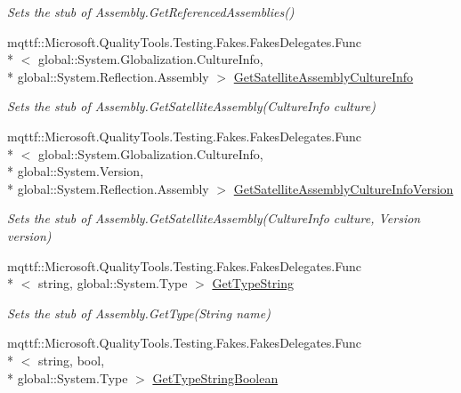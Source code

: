 \begin{DoxyCompactItemize}
\begin{DoxyCompactList}\small\item\em Sets the stub of Assembly.\-Get\-Referenced\-Assemblies()\end{DoxyCompactList}\item 
mqttf\-::\-Microsoft.\-Quality\-Tools.\-Testing.\-Fakes.\-Fakes\-Delegates.\-Func\\*
$<$ global\-::\-System.\-Globalization.\-Culture\-Info, \\*
global\-::\-System.\-Reflection.\-Assembly $>$ \hyperlink{class_system_1_1_reflection_1_1_fakes_1_1_stub_assembly_ab74404daaacf9351673b34b7cb87ffa0}{Get\-Satellite\-Assembly\-Culture\-Info}
\begin{DoxyCompactList}\small\item\em Sets the stub of Assembly.\-Get\-Satellite\-Assembly(\-Culture\-Info culture)\end{DoxyCompactList}\item 
mqttf\-::\-Microsoft.\-Quality\-Tools.\-Testing.\-Fakes.\-Fakes\-Delegates.\-Func\\*
$<$ global\-::\-System.\-Globalization.\-Culture\-Info, \\*
global\-::\-System.\-Version, \\*
global\-::\-System.\-Reflection.\-Assembly $>$ \hyperlink{class_system_1_1_reflection_1_1_fakes_1_1_stub_assembly_acd122bd330cb44eb78f75cf6732974c3}{Get\-Satellite\-Assembly\-Culture\-Info\-Version}
\begin{DoxyCompactList}\small\item\em Sets the stub of Assembly.\-Get\-Satellite\-Assembly(\-Culture\-Info culture, Version version)\end{DoxyCompactList}\item 
mqttf\-::\-Microsoft.\-Quality\-Tools.\-Testing.\-Fakes.\-Fakes\-Delegates.\-Func\\*
$<$ string, global\-::\-System.\-Type $>$ \hyperlink{class_system_1_1_reflection_1_1_fakes_1_1_stub_assembly_a288c281e4297182d10278fa34405f5ba}{Get\-Type\-String}
\begin{DoxyCompactList}\small\item\em Sets the stub of Assembly.\-Get\-Type(\-String name)\end{DoxyCompactList}\item 
mqttf\-::\-Microsoft.\-Quality\-Tools.\-Testing.\-Fakes.\-Fakes\-Delegates.\-Func\\*
$<$ string, bool, \\*
global\-::\-System.\-Type $>$ \hyperlink{class_system_1_1_reflection_1_1_fakes_1_1_stub_assembly_a9e5085aed72b945da2aaa7eee2a98f30}{Get\-Type\-String\-Boolean}

\end{DoxyCompactItemize}
